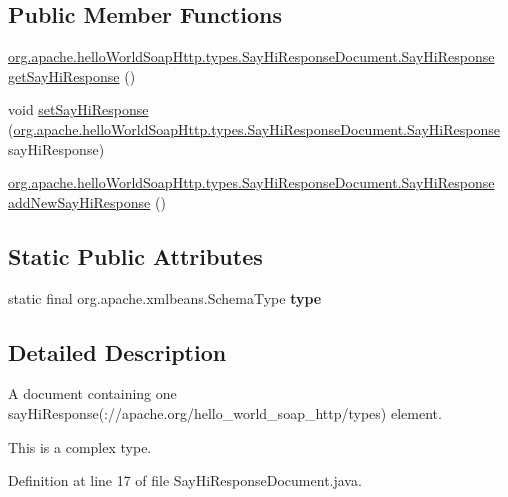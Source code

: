 \subsection*{Public Member Functions}
\begin{DoxyCompactItemize}
\item 
\hyperlink{interfaceorg_1_1apache_1_1hello_world_soap_http_1_1types_1_1_say_hi_response_document_1_1_say_hi_response}{org.\+apache.\+hello\+World\+Soap\+Http.\+types.\+Say\+Hi\+Response\+Document.\+Say\+Hi\+Response} \hyperlink{interfaceorg_1_1apache_1_1hello_world_soap_http_1_1types_1_1_say_hi_response_document_a30297b7943cada832bf414db3d912f26}{get\+Say\+Hi\+Response} ()
\item 
void \hyperlink{interfaceorg_1_1apache_1_1hello_world_soap_http_1_1types_1_1_say_hi_response_document_af5efff9b1dcd17f453b88bdf8f64cd59}{set\+Say\+Hi\+Response} (\hyperlink{interfaceorg_1_1apache_1_1hello_world_soap_http_1_1types_1_1_say_hi_response_document_1_1_say_hi_response}{org.\+apache.\+hello\+World\+Soap\+Http.\+types.\+Say\+Hi\+Response\+Document.\+Say\+Hi\+Response} say\+Hi\+Response)
\item 
\hyperlink{interfaceorg_1_1apache_1_1hello_world_soap_http_1_1types_1_1_say_hi_response_document_1_1_say_hi_response}{org.\+apache.\+hello\+World\+Soap\+Http.\+types.\+Say\+Hi\+Response\+Document.\+Say\+Hi\+Response} \hyperlink{interfaceorg_1_1apache_1_1hello_world_soap_http_1_1types_1_1_say_hi_response_document_a512a64cd76454a991701700fb5cb0465}{add\+New\+Say\+Hi\+Response} ()
\end{DoxyCompactItemize}
\subsection*{Static Public Attributes}
\begin{DoxyCompactItemize}
\item 
static final org.\+apache.\+xmlbeans.\+Schema\+Type {\bfseries type}
\end{DoxyCompactItemize}


\subsection{Detailed Description}
A document containing one say\+Hi\+Response(\+://apache.org/hello\+\_\+world\+\_\+soap\+\_\+http/types) element.

This is a complex type. 

Definition at line 17 of file Say\+Hi\+Response\+Document.\+java.



